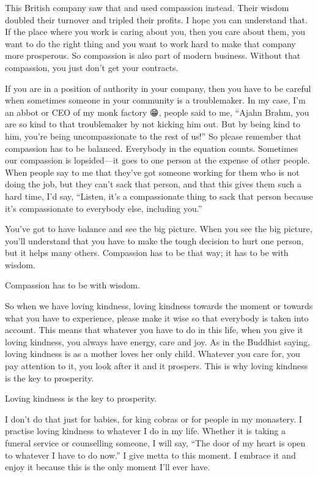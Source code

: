 \documentclass[12pt, openany]{book}
\newenvironment{aphorism}%
{%
\begin{center}\begin{itshape}
}%
{\end{itshape}\end{center}
}%
\begin{document}
This British company saw that and used compassion instead. Their wisdom doubled their turnover and tripled their profits. I hope you can understand that. If the place where you work is caring about you, then you care about them, you want to do the right thing and you want to work hard to make that company more prosperous. So compassion is also part of modern business. Without that compassion, you just don’t get your contracts. 

If you are in a position of authority in your company, then you have to be careful when sometimes someone in your community is a troublemaker. In my case, I’m an abbot or CEO of my monk factory 😁, people said to me, “Ajahn Brahm, you are so kind to that troublemaker by not kicking him out. But by being kind to him, you’re being uncompassionate to the rest of us!” So please remember that compassion has to be balanced. Everybody in the equation counts. Sometimes our compassion is lopsided—it goes to one person at the expense of other people. When people say to me that they’ve got someone working for them who is not doing the job, but they can’t sack that person, and that this gives them such a hard time, I’d say, “Listen, it’s a compassionate thing to sack that person because it’s compassionate to everybody else, including you.” 

You’ve got to have balance and see the big picture. When you see the big picture, you’ll understand that you have to make the tough decision to hurt one person, but it helps many others. Compassion has to be that way; it has to be with wisdom. 

\begin{aphorism}
Compassion has to be with wisdom.
\end{aphorism}

So when we have loving kindness, loving kindness towards the moment or towards what you have to experience, please make it wise so that everybody is taken into account. This means that whatever you have to do in this life, when you give it loving kindness, you always have energy, care and joy. As in the Buddhist saying, loving kindness is as a mother loves her only child. Whatever you care for, you pay attention to it, you look after it and it prospers. This is why loving kindness is the key to prosperity. 

\begin{aphorism}
Loving kindness is the key to prosperity.
\end{aphorism}

I don’t do that just for babies, for king cobras or for people in my monastery. I practise loving kindness to whatever I do in my life. Whether it is taking a funeral service or counselling someone, I will say, “The door of my heart is open to whatever I have to do now.” I give metta to this moment. I embrace it and enjoy it because this is the only moment I’ll ever have. 
\end{document}

